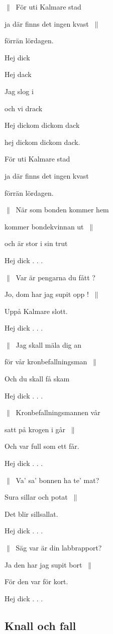 $\|\:$ För uti Kalmare stad

ja där finns det ingen kvast $\:\|$

förrän lördagen.

Hej dick

Hej dack

Jag slog i

och vi drack

Hej dickom dickom dack

hej dickom dickom dack.

För uti Kalmare stad

ja där finns det ingen kvast

förrän lördagen.\bigskip

$\|\:$ När som bonden kommer hem

kommer bondekvinnan ut $\:\|$

och är stor i sin trut

Hej dick . . .\bigskip

$\|\:$ Var är pengarna du fått ?

Jo, dom har jag supit opp ! $\:\|$

Uppå Kalmare slott.

Hej dick . . .\bigskip

$\|\:$ Jag skall mäla dig an

för vår kronbefallningsman $\:\|$

Och du skall få skam

Hej dick . . .\bigskip

$\|\:$ Kronbefallningsmannen vår

satt på krogen i går $\:\|$

Och var full som ett får.

Hej dick . . . \bigskip


$\|\:$ Va’ sa’ bonnen ha te’ mat?

Sura sillar och potat $\:\|$

Det blir sillsallat.

Hej dick . . .\bigskip

$\|\:$ Säg var är din labbrapport?

Ja den har jag supit bort $\:\|$

För den var för kort.

Hej dick . . . 

\subsection{\textbf{Knall och fall}}

